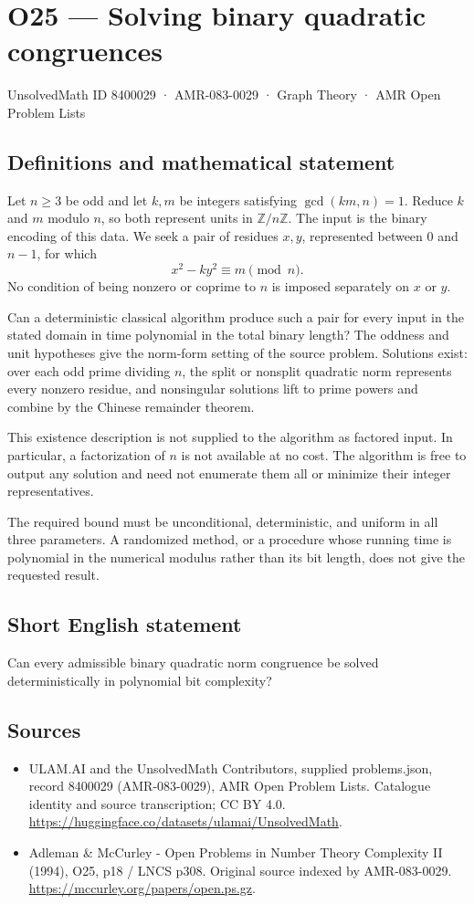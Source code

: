 \documentclass[11pt,a4paper]{article}
\begin{document}
\section*{O25 — Solving binary quadratic congruences}\label{8400029}
{\small UnsolvedMath ID 8400029 · AMR-083-0029 · Graph Theory · AMR Open Problem Lists}
\subsection{Definitions and mathematical statement}
Let $n\ge3$ be odd and let $k,m$ be integers satisfying $\gcd(km,n)=1$. Reduce $k$ and $m$ modulo $n$, so both represent units in $\mathbb Z/n\mathbb Z$. The input is the binary encoding of this data. We seek a pair of residues $x,y$, represented between $0$ and $n-1$, for which
\[
x^2-ky^2\equiv m\pmod n.
\]
No condition of being nonzero or coprime to $n$ is imposed separately on $x$ or $y$.

Can a deterministic classical algorithm produce such a pair for every input in the stated domain in time polynomial in the total binary length? The oddness and unit hypotheses give the norm-form setting of the source problem. Solutions exist: over each odd prime dividing $n$, the split or nonsplit quadratic norm represents every nonzero residue, and nonsingular solutions lift to prime powers and combine by the Chinese remainder theorem.

This existence description is not supplied to the algorithm as factored input. In particular, a factorization of $n$ is not available at no cost. The algorithm is free to output any solution and need not enumerate them all or minimize their integer representatives.

The required bound must be unconditional, deterministic, and uniform in all three parameters. A randomized method, or a procedure whose running time is polynomial in the numerical modulus rather than its bit length, does not give the requested result.
\subsection{Short English statement}
Can every admissible binary quadratic norm congruence be solved deterministically in polynomial bit complexity?
\subsection{Sources}
\begin{itemize}
\item[S1] ULAM.AI and the UnsolvedMath Contributors, supplied problems.json, record 8400029 (AMR-083-0029), AMR Open Problem Lists. Catalogue identity and source transcription; CC BY 4.0.
\url{https://huggingface.co/datasets/ulamai/UnsolvedMath}.
\item[S2] Adleman \& McCurley - Open Problems in Number Theory Complexity II (1994), O25, p18 / LNCS p308. Original source indexed by AMR-083-0029.
\url{https://mccurley.org/papers/open.ps.gz}.
\end{itemize}
\end{document}
